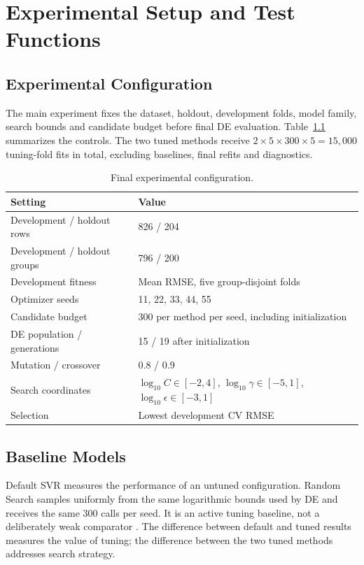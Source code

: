 \chapter{Experimental Setup and Test Functions}
\section{Experimental Configuration}
The main experiment fixes the dataset, holdout, development folds, model family, search bounds and candidate budget before final DE evaluation. Table~\ref{tab:config} summarizes the controls. The two tuned methods receive $2\times5\times300\times5=15{,}000$ tuning-fold fits in total, excluding baselines, final refits and diagnostics.
\begin{table}[htbp]\centering\caption{Final experimental configuration.}\label{tab:config}\begin{tabularx}{\textwidth}{lX}\toprule Setting&Value\\\midrule Development / holdout rows&826 / 204\\Development / holdout groups&796 / 200\\Development fitness&Mean RMSE, five group-disjoint folds\\Optimizer seeds&11, 22, 33, 44, 55\\Candidate budget&300 per method per seed, including initialization\\DE population / generations&15 / 19 after initialization\\Mutation / crossover&0.8 / 0.9\\Search coordinates&$\log_{10}C\in[-2,4]$, $\log_{10}\gamma\in[-5,1]$, $\log_{10}\epsilon\in[-3,1]$\\Selection&Lowest development CV RMSE\\\bottomrule\end{tabularx}\end{table}
\section{Baseline Models}
Default SVR measures the performance of an untuned configuration. Random Search samples uniformly from the same logarithmic bounds used by DE and receives the same 300 calls per seed. It is an active tuning baseline, not a deliberately weak comparator \cite{bergstra}. The difference between default and tuned results measures the value of tuning; the difference between the two tuned methods addresses search strategy.

